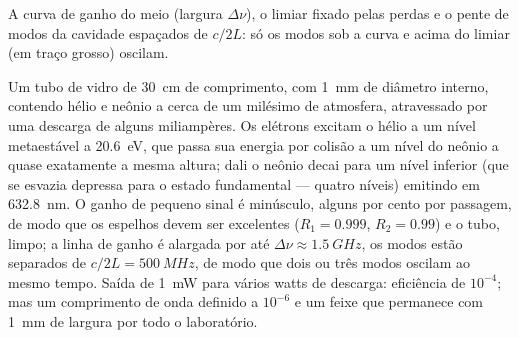 \begin{omfigure}

{\small A curva de ganho do meio (largura $\Delta\nu$), o limiar
fixado pelas perdas e o pente de modos da cavidade espaçados de $c/2L$: só os
modos sob a curva e acima do limiar (em traço grosso) oscilam.}
\end{omfigure}

\begin{example}\label{ex:b2:laser:hene}
Um tubo de vidro de \qty{30}{cm} de comprimento, com \qty{1}{mm} de diâmetro interno, contendo hélio e
neônio a cerca de um milésimo de atmosfera, atravessado por uma descarga de
alguns miliampères. Os elétrons excitam o hélio a um nível metaestável a
\qty{20.6}{eV}, que passa sua energia por colisão a um nível do neônio a
quase exatamente a mesma altura; dali o neônio decai para um nível inferior
(que se esvazia depressa para o estado fundamental --- quatro níveis) emitindo em
\qty{632.8}{nm}. O ganho de pequeno sinal é minúsculo, alguns por cento por
passagem, de modo que os espelhos devem ser excelentes ($R_1 = 0.999$, $R_2 = 0.99$)
e o tubo, limpo; a linha de ganho é alargada por  até
$\Delta\nu \approx \qty{1.5}{GHz}$, os modos estão separados de $c/2L = \qty{500}{MHz}$,
de modo que dois ou três modos oscilam ao mesmo tempo. Saída de \qty{1}{mW} para
vários watts de descarga: eficiência de $10^{-4}$; mas um comprimento de onda
definido a $10^{-6}$ e um feixe que permanece com \qty{1}{mm} de largura por todo o
laboratório.
\end{example}

